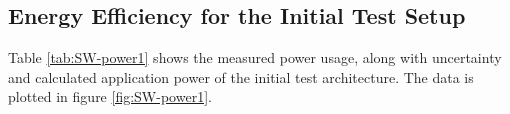 \begin{appendix}
%
%
%

\subsection{Energy Efficiency for the Initial Test Setup}
\label{sec:energy-initial}

Table \ref{tab:SW-power1} shows the measured power usage, along with uncertainty and calculated application power of the initial test architecture.
The data is plotted in figure \ref{fig:SW-power1}.


\end{appendix}
